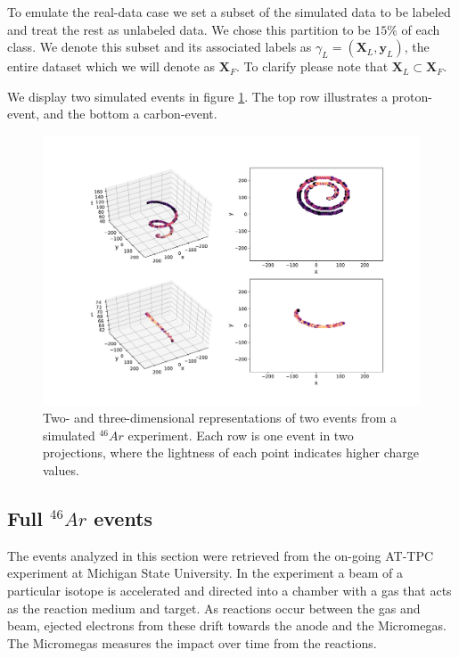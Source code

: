 To emulate the real-data case we set a subset of the simulated data to be labeled and treat the rest as unlabeled data. We chose this partition to be $15\%$ of each class. We denote this subset and its associated labels as $\gamma_L=(\mathbf{X}_L, \mathbf{y}_L)$, the entire dataset which we will denote as $\mathbf{X}_F$. To clarify please note that $\mathbf{X}_L \subset \mathbf{X}_F$.

We display two simulated events in figure \ref{fig:sim_samples}. The top row illustrates a proton-event, and the bottom a carbon-event. 

\begin{figure}[H]
\centering
\includegraphics[width=\textwidth]{../plots/display_eventssimulated.pdf}
\caption[Displaying simulated events in 2D and 3D]{Two- and three-dimensional representations of two events from a simulated ${}^{46}Ar$ experiment. Each row is one event in two projections, where the lightness of each point indicates higher charge values.}\label{fig:sim_samples}
\end{figure}


\subsection{Full \texorpdfstring{${}^{46}Ar$}{46Ar}  events}\label{sec:data_real}

The events analyzed in this section were retrieved from the on-going AT-TPC experiment at Michigan State University. In the experiment a beam of a particular isotope is accelerated and directed into a chamber with a gas that acts as the reaction medium and target. As reactions occur between the gas and beam, ejected electrons from these drift towards the anode and the Micromegas. The Micromegas measures the impact over time from the reactions.


